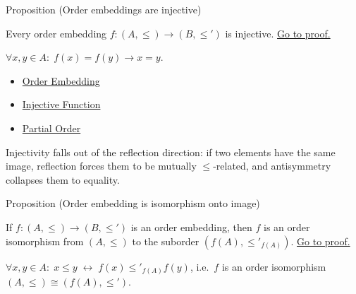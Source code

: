 \begin{propositionbox}{Proposition (Order embeddings are injective)}
\begin{proposition}\label{prop:embedding-injective}
Every order embedding $f : (A, \leq) \to (B, \leq')$ is injective.
\hyperref[prf:embedding-injective]{Go to proof.}
\end{proposition}
\end{propositionbox}

\begin{remark*}
$\forall x,y \in A:\; f(x) = f(y) \to x = y$.
\end{remark*}




\begin{dependencies}
\begin{itemize}
  \item \hyperref[def:order-embedding]{Order Embedding}
  \item \hyperref[def:injective]{Injective Function}
  \item \hyperref[def:partial-order]{Partial Order}
\end{itemize}
\end{dependencies}

\begin{remark*}
Injectivity falls out of the reflection direction: if two elements have the
same image, reflection forces them to be mutually $\leq$-related, and
antisymmetry collapses them to equality.
\end{remark*}

\begin{propositionbox}{Proposition (Order embedding is isomorphism onto image)}
\begin{proposition}\label{prop:embedding-iso}
If $f : (A, \leq) \to (B, \leq')$ is an order embedding, then $f$ is an
order isomorphism from $(A, \leq)$ to the suborder $(f(A), \leq'_{f(A)})$.
\hyperref[prf:embedding-iso]{Go to proof.}
\end{proposition}
\end{propositionbox}

\begin{remark*}
$\forall x,y \in A:\; x \leq y \;\leftrightarrow\; f(x) \leq'_{f(A)} f(y)$, i.e.\ $f$ is an order isomorphism $(A,\leq)\cong(f(A),\leq')$.
\end{remark*}




